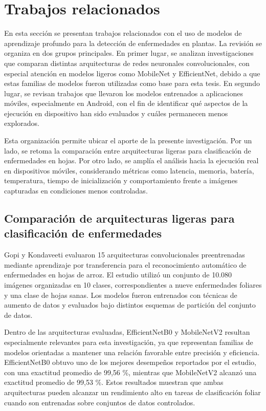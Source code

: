 \chapter{Trabajos relacionados}

En esta sección se presentan trabajos relacionados con el uso de modelos de aprendizaje profundo para la detección de enfermedades en
plantas. La revisión se organiza en dos grupos principales. En primer lugar, se analizan investigaciones que comparan distintas
arquitecturas de redes neuronales convolucionales, con especial atención en modelos ligeros como MobileNet y EfficientNet, debido a que
estas familias de modelos fueron utilizadas como base para esta tesis. En segundo lugar, se revisan trabajos que llevaron los modelos
entrenados a aplicaciones móviles, especialmente en Android, con el fin de identificar qué aspectos de la ejecución en dispositivo han
sido evaluados y cuáles permanecen menos explorados.

Esta organización permite ubicar el aporte de la presente investigación. Por un lado, se retoma la comparación entre arquitecturas
ligeras para clasificación de enfermedades en hojas. Por otro lado, se amplía el análisis hacia la ejecución real en dispositivos
móviles, considerando métricas como latencia, memoria, batería, temperatura, tiempo de inicialización y comportamiento frente a imágenes
capturadas en condiciones menos controladas.

\section{Comparación de arquitecturas ligeras para clasificación de enfermedades}

Gopi y Kondaveeti \cite{agronomy13040961} evaluaron 15 arquitecturas convolucionales preentrenadas mediante aprendizaje por
transferencia para el reconocimiento automático de enfermedades en hojas de arroz. El estudio utilizó un conjunto de 10.080 imágenes
organizadas en 10 clases, correspondientes a nueve enfermedades foliares y una clase de hojas sanas. Los modelos fueron entrenados con
técnicas de aumento de datos y evaluados bajo distintos esquemas de partición del conjunto de datos.

Dentro de las arquitecturas evaluadas, EfficientNetB0 y MobileNetV2 resultan especialmente relevantes para esta investigación, ya que
representan familias de modelos orientadas a mantener una relación favorable entre precisión y eficiencia. EfficientNetB0 obtuvo uno de
los mejores desempeños reportados por el estudio, con una exactitud promedio de 99,56 \%, mientras que MobileNetV2 alcanzó una exactitud
promedio de 99,53 \%. Estos resultados muestran que ambas arquitecturas pueden alcanzar un rendimiento alto en tareas de clasificación
foliar cuando son entrenadas sobre conjuntos de datos controlados.

